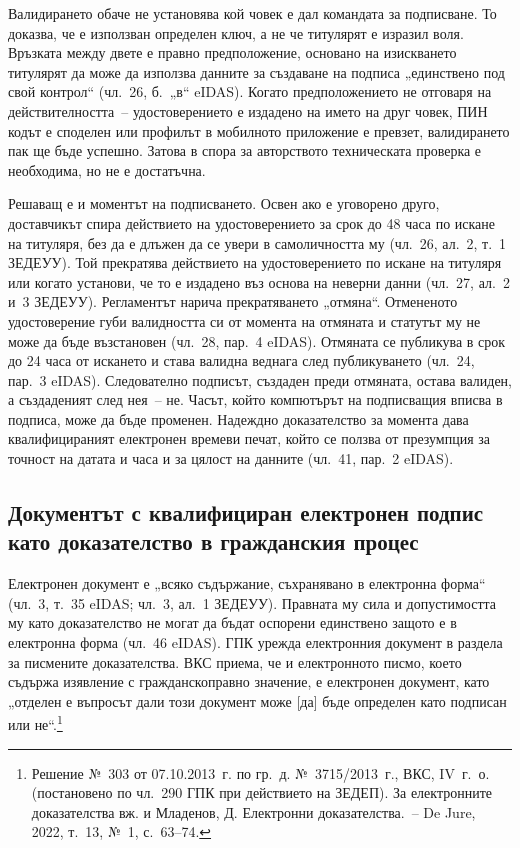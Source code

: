 Валидирането обаче не установява кой човек е дал командата за подписване. То доказва, че е
използван определен ключ, а не че титулярят е изразил воля. Връзката между двете е правно
предположение, основано на изискването титулярят да може да използва данните за създаване
на подписа „единствено под свой контрол“ (чл.~26, б.~„в“ eIDAS). Когато предположението не
отговаря на действителността~-- удостоверението е издадено на името на друг човек, ПИН
кодът е споделен или профилът в мобилното приложение е превзет, валидирането пак ще бъде
успешно. Затова в спора за авторството техническата проверка е необходима, но не е
достатъчна.

Решаващ е и моментът на подписването. Освен ако е уговорено друго, доставчикът спира
действието на удостоверението за срок до 48 часа по искане на титуляря, без да е длъжен да
се увери в самоличността му (чл.~26, ал.~2, т.~1 ЗЕДЕУУ). Той прекратява действието на
удостоверението по искане на титуляря или когато установи, че то е издадено въз основа на
неверни данни (чл.~27, ал.~2 и~3 ЗЕДЕУУ). Регламентът нарича прекратяването „отмяна“.
Отмененото удостоверение губи валидността си от момента на отмяната и статутът му не може
да бъде възстановен (чл.~28, пар.~4 eIDAS). Отмяната се публикува в срок до 24 часа от
искането и става валидна веднага след публикуването (чл.~24, пар.~3 eIDAS). Следователно
подписът, създаден преди отмяната, остава валиден, а създаденият след нея~-- не. Часът,
който компютърът на подписващия вписва в подписа, може да бъде променен. Надеждно
доказателство за момента дава квалифицираният електронен времеви печат, който се ползва
от презумпция за точност на датата и часа и за цялост на данните (чл.~41, пар.~2 eIDAS).

\subsection{Документът с квалифициран електронен подпис като доказателство в гражданския процес}
\label{sec:dokazatelstvo}

Електронен документ е „всяко съдържание, съхранявано в електронна форма“ (чл.~3, т.~35
eIDAS; чл.~3, ал.~1 ЗЕДЕУУ). Правната му сила и допустимостта му като доказателство не
могат да бъдат оспорени единствено защото е в електронна форма (чл.~46 eIDAS). ГПК урежда
електронния документ в раздела за писмените доказателства. ВКС приема, че и електронното
писмо, което съдържа изявление с гражданскоправно значение, е електронен документ, като
„отделен е въпросът дали този документ може [да] бъде определен като подписан или
не“.\footnote{Решение №~303 от 07.10.2013~г. по гр.~д. №~3715/2013~г., ВКС, IV~г.~о.
(постановено по чл.~290 ГПК при действието на ЗЕДЕП). За електронните доказателства вж. и
Младенов, Д. Електронни доказателства.~-- De Jure, 2022, т.~13, №~1, с.~63--74.}

